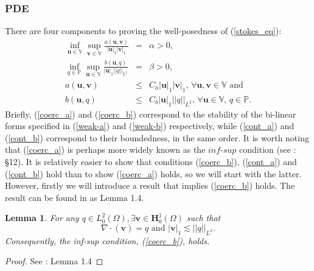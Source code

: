 \documentclass[12pt,a4paper]{article}
\newtheorem{lemma}[theorem]{Lemma}
\theoremstyle{definition}
\begin{document}
\subsubsection{PDE}\label{PDE_cont}
There are four components to proving the well-posedness of (\ref{stokes_eq}):
	 \begin{eqnarray}\label{coerc_a}
	\inf_{\textbf{u}\in \mathbb{V}}\sup_{\textbf{v}\in \mathbb{V}}\frac{a\left(\textbf{u},\textbf{v}\right)}{\left|\textbf{u}\right|_1 \left|\textbf{v}\right|_1}&=&\alpha>0,\\\label{coerc_b}
			\inf_{q\in \mathbb{P}}\sup_{\textbf{u}\in \mathbb{V}}\frac{b\left(\textbf{u},q\right)}{\left|\textbf{u}\right|_1 \left|\left|q\right|\right|_{L^2}}&=&\beta>0,\\\label{cont_a}
		a\left(\textbf{u},\textbf{v}\right)&\leq& C_a\left|\textbf{u}\right|_1\left|\textbf{v}\right|_1,\, \forall \textbf{u},\textbf{v} \in \mathbb{V}\text{ and}\\\label{cont_b}
		b\left(\textbf{u},q\right)&\leq& C_b\left|\textbf{u}\right|_1\left|\left|q\right|\right|_{L^2},\,\forall \textbf{u} \in \mathbb{V},\, q \in \mathbb{P}.
	\end{eqnarray}
Briefly, (\ref{coerc_a}) and (\ref{coerc_b}) correspond to the stability of the bi-linear forms specified in (\ref{weak-a}) and (\ref{weak-b}) respectively, while (\ref{cont_a}) and (\ref{cont_b}) correspond to their boundedness, in the same order. It is worth noting that (\ref{coerc_a}) is perhaps more widely known as the $\textit{inf-sup}$ condition (see \cite{brenner2007mathematical}: \S 12). It is relatively easier to show that conditions (\ref{coerc_b}), (\ref{cont_a}) and (\ref{cont_b}) hold than to show (\ref{coerc_a}) holds, so we will start with the latter.  However, firstly we will introduce a result that implies (\ref{coerc_b}) holds.  The result can be found in \cite{Chen2016} as Lemma 1.4.
\begin{lemma}\label{Lemma_equiv}
	For any $q\in L^2_0\left(\Omega\right), \exists \textbf{v}\in \textbf{H}^1_0\left(\Omega\right)$ such that
	\begin{equation}
		\nabla \cdot \left(\textbf{v}\right) = q \text{ and } \left|\textbf{v}\right|_1 \lesssim \left|\left|q\right|\right|_{L^2}\nonumber.
	\end{equation}
	Consequently, the inf-sup condition, (\ref{coerc_b}), holds.
\end{lemma}
\begin{proof}
	See \cite{Chen2016}: Lemma 1.4
\end{proof}
\end{document}
